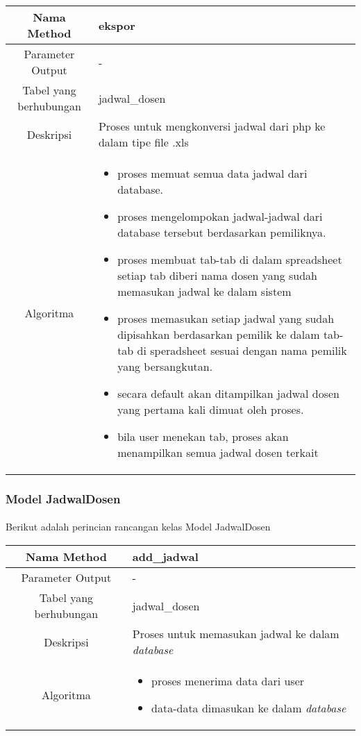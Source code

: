\begin{tabular}{|c|p{11cm}|}
\hline
Nama Method 	& 	ekspor 	\\
\hline
Parameter Output & - \\
\hline
Tabel yang berhubungan & jadwal\_dosen \\
\hline
Deskripsi	& Proses untuk mengkonversi jadwal dari php ke dalam tipe file .xls \\
\hline
Algoritma	& \begin{itemize}
				\item proses memuat semua data jadwal dari database.
				\item proses mengelompokan jadwal-jadwal dari database tersebut berdasarkan pemiliknya.
				\item proses membuat tab-tab di dalam spreadsheet setiap tab diberi nama dosen yang sudah memasukan jadwal ke dalam sistem
				\item proses memasukan setiap jadwal yang sudah dipisahkan berdasarkan pemilik ke dalam tab-tab di speradsheet sesuai dengan nama pemilik yang bersangkutan.
				\item secara default akan ditampilkan jadwal dosen yang pertama kali dimuat oleh proses.
				\item bila user menekan tab, proses akan menampilkan semua jadwal dosen terkait
				\end{itemize} \\
\hline
\end{tabular}

\subsubsection{Model JadwalDosen}
\paragraph{} Berikut adalah perincian rancangan kelas Model JadwalDosen \\
\begin{tabular}{|c|p{11cm}|}
\hline
Nama Method 	& 	add\_jadwal 	\\
\hline
Parameter Output & - \\
\hline
Tabel yang berhubungan & jadwal\_dosen \\
\hline
Deskripsi	& Proses untuk memasukan jadwal ke dalam \textit{database} \\
\hline
Algoritma	& \begin{itemize}
				\item proses menerima data dari user
				\item data-data dimasukan ke dalam \textit{database}
				\end{itemize} \\
\hline
\end{tabular}
\\

